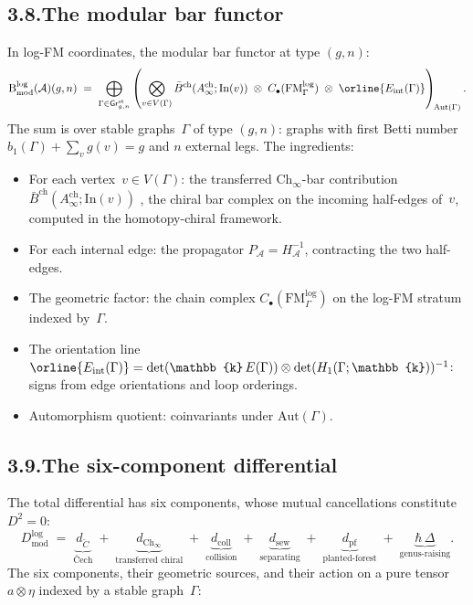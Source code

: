 \documentclass[11pt]{report}
\theoremstyle{definition}
\theoremstyle{remark}
\providecommand{\cA}{\mathcal{A}}
\providecommand{\Bbbk}{\mathbb{k}}
\numberwithin{equation}{section}
\begin{document}
\subsection*{3.8.\enspace The modular bar functor}

In log-FM coordinates, the modular bar functor at type $(g,n)$:
\[
\mathrm B^{\log}_{\mathrm{mod}}(\cA)(g,n)
\;=\;
\bigoplus_{\Gamma\in\mathsf{Gr}^{\mathrm{st}}_{g,n}}
\left(
\bigotimes_{v\in V(\Gamma)}
\bar B^{\mathrm{ch}}(A^{\mathrm{ch}}_\infty;\mathrm{In}(v))
\;\otimes\;
C_\bullet(\mathrm{FM}^{\log}_\Gamma)
\;\otimes\;
\orline{E_{\mathrm{int}}(\Gamma)}
\right)_{\!\mathrm{Aut}(\Gamma)}.
\]
The sum is over stable graphs~$\Gamma$ of type $(g,n)$: graphs with
first Betti number $b_1(\Gamma)+\sum_v g(v)=g$ and $n$ external
legs. The ingredients:
\begin{itemize}
\item For each vertex~$v\in V(\Gamma)$: the transferred
$\mathrm{Ch}_\infty$-bar contribution
$\bar B^{\mathrm{ch}}(A^{\mathrm{ch}}_\infty;\mathrm{In}(v))$
, the chiral bar complex on the incoming half-edges of~$v$,
computed in the homotopy-chiral framework.
\item For each internal edge: the propagator
$P_\cA=H_\cA^{-1}$, contracting the two half-edges.
\item The geometric factor: the chain complex
$C_\bullet(\mathrm{FM}^{\log}_\Gamma)$ on the log-FM stratum
indexed by~$\Gamma$.
\item The orientation line
$\orline{E_{\mathrm{int}}(\Gamma)}
=\det(\Bbbk\,E(\Gamma))
\otimes\det(H_1(\Gamma;\Bbbk))^{-1}$:
signs from edge orientations and loop orderings.
\item Automorphism quotient: coinvariants under
$\mathrm{Aut}(\Gamma)$.
\end{itemize}

\subsection*{3.9.\enspace The six-component differential}

The total differential has six components, whose mutual
cancellations constitute $D^2=0$:
\[
D^{\log}_{\mathrm{mod}}
\;=\;
\underbrace{d_{\check C}}_{\text{\v Cech}}
\;+\;
\underbrace{d_{\mathrm{Ch}_\infty}}_{\text{transferred chiral}}
\;+\;
\underbrace{d_{\mathrm{coll}}}_{\text{collision}}
\;+\;
\underbrace{d_{\mathrm{sew}}}_{\text{separating}}
\;+\;
\underbrace{d_{\mathrm{pf}}}_{\text{planted-forest}}
\;+\;
\underbrace{\hbar\,\Delta}_{\text{genus-raising}}.
\]
The six components, their geometric sources, and their action on a
pure tensor $a\otimes\eta$ indexed by a stable graph~$\Gamma$:
\end{document}

